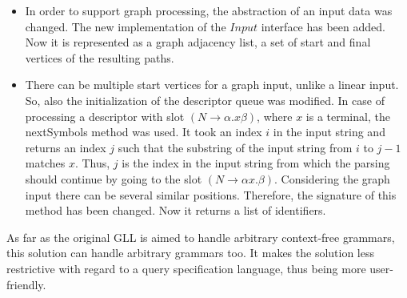 \begin{itemize}
    \item In order to support graph processing, the abstraction of an input data was changed. The new implementation of the $Input$ interface has been added. Now it is represented as a graph adjacency list, a set of start and final vertices of the resulting paths.
    \item There can be multiple start vertices for a graph input, unlike a linear input. So, also the initialization of the descriptor queue was modified. In case of processing a descriptor with slot $(N \rightarrow \alpha.x\beta)$, where $x$ is a terminal, the nextSymbols method was used. It took an index $i$ in the input string and returns an index $j$ such that the substring of the input string from $i$ to $j - 1$ matches $x$. Thus, $ j $ is the index in the input string from which the parsing  should continue by going to the slot $(N \rightarrow \alpha x.\beta)$. Considering the graph input there can be several similar positions. Therefore, the signature of this method has been changed. Now it returns a list of identifiers.
\end{itemize}

As far as the original GLL is aimed to handle arbitrary context-free grammars, this solution can handle arbitrary grammars too. It makes the solution less restrictive with regard to a query specification language, thus being more user-friendly.


